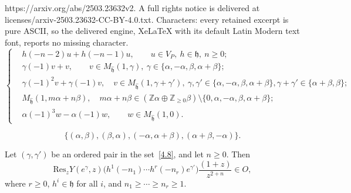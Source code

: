 \documentclass[10pt,a4paper]{amsart}
\def \ga {\gamma}
\def \h {\mathfrak{h}}
\def\Res{\mathrm{Res}}
\begin{document}
https://arxiv.org/abs/2503.23632v2. A full rights notice is delivered at licenses/arxiv-2503.23632-CC-BY-4.0.txt. Characters: every retained excerpt is pure ASCII, so the delivered engine, XeLaTeX with its default Latin Modern text font, reports no missing character.
		\begin{equation}\label{4.7}
			\begin{cases}
				&h(-n-2)u+h(-n-1)u,\qquad u\in V_P,\ h\in \mathfrak{h},\ n\geq 0;\\[4pt]
				&\gamma(-1)v+v,\qquad v\in M_{\hat{\mathfrak{h}}}(1,\gamma),\ \gamma\in \{\alpha,-\alpha,\beta,\alpha+\beta\};\\[4pt]
				&\gamma(-1)^2v+\gamma(-1)v,\quad v\in M_{\hat{\mathfrak{h}}}(1,\gamma+\gamma'),\ \gamma,\gamma'\in \{\alpha,-\alpha,\beta,\alpha+\beta\},\gamma+\gamma'\in \{\alpha+\beta,\beta\};\\[4pt]
				&M_{\hat{\mathfrak{h}}}(1,m\alpha+n\beta),\quad m\alpha+n\beta\in (\mathbb{Z}\alpha\oplus\mathbb{Z}_{\geq 0}\beta)\setminus\{0,\alpha,-\alpha,\beta,\alpha+\beta\};\\[4pt]
				&\alpha(-1)^3w-\alpha(-1)w,\qquad w\in M_{\hat{\mathfrak{h}}}(1,0).
			\end{cases}
		\end{equation}

	\begin{equation}\label{4.8}
		\{(\alpha,\beta),(\beta,\alpha),(-\alpha,\alpha+\beta),(\alpha+\beta,-\alpha)\}.
	\end{equation}

	\begin{prop}\label{prop4.5}
		Let $(\ga,\ga')$ be an ordered pair in the set~\eqref{4.8}, and let $n\geq 0$. Then 
		\begin{equation}\label{4.14}
			\Res_z Y(e^{\ga},z)\big(h^1(-n_1)\cdots h^r(-n_r)e^{\ga'}\big)\frac{(1+z)}{z^{2+n}}\in O,
		\end{equation}
		where $r\geq 0$, $h^i\in \h$ for all $i$, and $n_1\geq \cdots \geq n_r\geq 1$.
	\end{prop}
\end{document}
